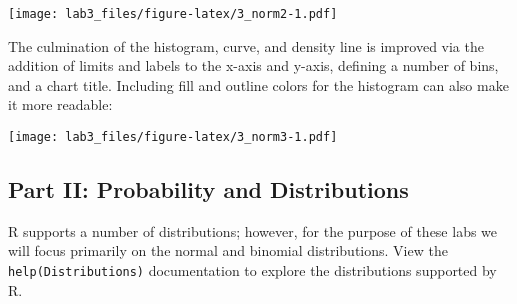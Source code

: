 \documentclass[]{article}
\newenvironment{Shaded}{\begin{snugshade}}{\end{snugshade}}
\newcommand{\KeywordTok}[1]{\textcolor[rgb]{0.13,0.29,0.53}{\textbf{#1}}}
\newcommand{\DataTypeTok}[1]{\textcolor[rgb]{0.13,0.29,0.53}{#1}}
\newcommand{\DecValTok}[1]{\textcolor[rgb]{0.00,0.00,0.81}{#1}}
\newcommand{\FloatTok}[1]{\textcolor[rgb]{0.00,0.00,0.81}{#1}}
\newcommand{\StringTok}[1]{\textcolor[rgb]{0.31,0.60,0.02}{#1}}
\newcommand{\OperatorTok}[1]{\textcolor[rgb]{0.81,0.36,0.00}{\textbf{#1}}}
\newcommand{\NormalTok}[1]{#1}
\begin{document}
\texttt{[image: lab3\_files/figure-latex/3\_norm2-1.pdf]}

The culmination of the histogram, curve, and density line is improved
via the addition of limits and labels to the x-axis and y-axis, defining
a number of bins, and a chart title. Including fill and outline colors
for the histogram can also make it more readable:

\begin{Shaded}
\end{Shaded}

\texttt{[image: lab3\_files/figure-latex/3\_norm3-1.pdf]}

\subsection{Part II: Probability and
Distributions}\label{part-ii-probability-and-distributions}

R supports a number of distributions; however, for the purpose of these
labs we will focus primarily on the normal and binomial distributions.
View the \texttt{help(Distributions)} documentation to explore the
distributions supported by R.
\end{document}
